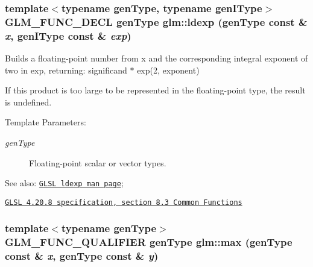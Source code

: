 \hypertarget{group__core__func__common_g4b829eccd70b08b1a349e42ae3d4f4f7}{
\subsubsection[ldexp]{\setlength{\rightskip}{0pt plus 5cm}template$<$typename genType, typename genIType$>$ GLM\_\-FUNC\_\-DECL genType glm::ldexp (genType const \& {\em x}, \/  genIType const \& {\em exp})}}
\label{group__core__func__common_g4b829eccd70b08b1a349e42ae3d4f4f7}


Builds a floating-point number from x and the corresponding integral exponent of two in exp, returning: significand $\ast$ exp(2, exponent)

If this product is too large to be represented in the floating-point type, the result is undefined.

\begin{Desc}
\item[Template Parameters:]
\begin{description}
\item[{\em genType}]Floating-point scalar or vector types.\end{description}
\end{Desc}
\begin{Desc}
\item[See also:]\href{http://www.opengl.org/sdk/docs/manglsl/xhtml/ldexp.xml}{\tt GLSL ldexp man page}; 

\href{http://www.opengl.org/registry/doc/GLSLangSpec.4.20.8.pdf}{\tt GLSL 4.20.8 specification, section 8.3 Common Functions} \end{Desc}
\hypertarget{group__core__func__common_g4e4d7b280fec55e5dfeb1367a1a2597d}{
\subsubsection[max]{\setlength{\rightskip}{0pt plus 5cm}template$<$typename genType$>$ GLM\_\-FUNC\_\-QUALIFIER genType glm::max (genType const \& {\em x}, \/  genType const \& {\em y})}}
\label{group__core__func__common_g4e4d7b280fec55e5dfeb1367a1a2597d}



